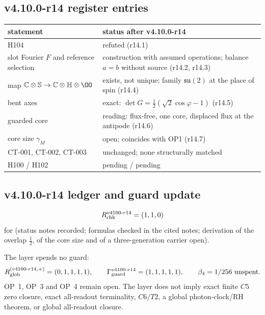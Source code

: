 \subsection*{v4.10.0-r14 register entries}
\label{subsec:v4100-r14-register}

\begin{center}
\small
\begin{tabular}{@{}>{\raggedright\arraybackslash}p{}>{\raggedright\arraybackslash}p{}@{}}
\toprule
statement & status after v4.10.0-r14\\
\midrule
H104 & refuted (r14.1)\\
slot Fourier \(F\) and reference selection & construction with assumed operations; balance \(a=b\) without source (r14.2, r14.3)\\
map \(\mathbb C\otimes\mathbb S\to\mathbb C\otimes\mathbb H\otimes\OO\) & exists, not unique; family \(\mathfrak{su}(2)\) at the place of spin (r14.4)\\
bent axes & exact: \(\det G=\tfrac12(\sqrt2\cos\varphi-1)\) (r14.5)\\
guarded core & reading: flux-free, one core, displaced flux at the antipode (r14.6)\\
core size \(\gamma_M\) & open; coincides with OP1 (r14.7)\\
CT-001, CT-002, CT-003 & unchanged; none structurally matched\\
H100 / H102 & pending / pending\\
\bottomrule
\end{tabular}
\end{center}

\subsection*{v4.10.0-r14 ledger and guard update}
\label{subsec:v4100-r14-ledger-guard}

\[
R_{\rm chk}^{v4100\text{-}r14}=(1,1,0)
\]
for (status notes recorded; formulas checked in the cited notes; derivation of the overlap \(\tfrac12\), of the core size and
of a three-generation carrier open).

The layer spends no guard:
\[
R_{\rm glob}^{(v4100\text{-}r14,+)}=(0,1,1,1,1),
\qquad
\Gamma_{\rm guard}^{v4100\text{-}r14}=(1,1,1,1,1),
\qquad
\beta_4=1/256\ \text{unspent}.
\]
OP~1, OP~3 and OP~4 remain open.  The layer does not imply exact finite \(C5\) zero closure, exact all-readout terminality,
\(C6/T2\), a global photon-clock/RH theorem, or global all-readout closure.
